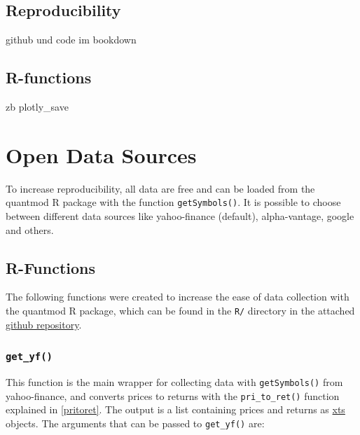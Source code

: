 \documentclass[
  oneside]{book}
\begin{document}
\hypertarget{reproducibility}{%
\section{Reproducibility}\label{reproducibility}}

github und code im bookdown

\hypertarget{r-functions}{%
\section{R-functions}\label{r-functions}}

zb plotly\_save

\hypertarget{open-data-sources}{%
\chapter{Open Data Sources}\label{open-data-sources}}

To increase reproducibility, all data are free and can be loaded from the quantmod R package with the function \texttt{getSymbols()}. It is possible to choose between different data sources like yahoo-finance (default), alpha-vantage, google and others.

\hypertarget{r-functions-1}{%
\section{R-Functions}\label{r-functions-1}}

The following functions were created to increase the ease of data collection with the quantmod R package, which can be found in the \texttt{R/} directory in the attached \href{https://github.com/AxelCode-R/Master-Thesis}{github repository}.

\hypertarget{get_yf}{%
\subsection{\texorpdfstring{\texttt{get\_yf()}}{get\_yf()}}\label{get_yf}}

This function is the main wrapper for collecting data with \texttt{getSymbols()} from yahoo-finance, and converts prices to returns with the \texttt{pri\_to\_ret()} function explained in \ref{pritoret}. The output is a list containing prices and returns as \href{https://cran.r-project.org/web/packages/xts/xts.pdf}{xts} objects. The arguments that can be passed to \texttt{get\_yf()} are:
\end{document}
